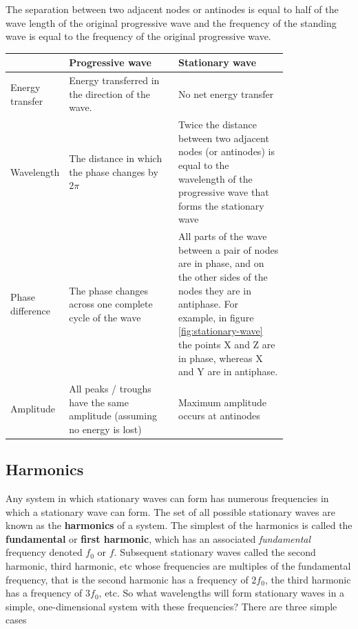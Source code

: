 The separation between two adjacent nodes or antinodes is equal to half of the wave length of the original progressive wave and the frequency of the standing wave is equal to the frequency of the original progressive wave. 

\begin{table}[h!]
    {
        \begin{tabular}{l|p{0.4\linewidth}|p{0.4\linewidth}}
            \hspace{1mm} & Progressive wave & Stationary wave  \\
            \hline
            Energy transfer & Energy transferred in the direction of the wave. & No net energy transfer \\
            Wavelength & The distance in which the phase changes by $2\pi$ & Twice the distance between two adjacent nodes (or antinodes) is equal to the wavelength of the progressive wave that forms the stationary wave  \\
            Phase difference & The phase changes across one complete cycle of the wave & All parts of the wave between a pair of nodes are in phase, and on the other sides of the nodes they are in antiphase. For example, in figure \ref{fig:stationary-wave} the points X and Z are in phase, whereas X and Y are in antiphase. \\
            Amplitude & All peaks / troughs have the same amplitude (assuming no energy is lost) & Maximum amplitude occurs at antinodes
        \end{tabular}
    }
\end{table}
\FloatBarrier

\subsection{Harmonics}

Any system in which stationary waves can form has numerous frequencies in which a stationary wave can form. The set of all possible stationary waves are known as the \textbf{harmonics} of a system. The simplest of the harmonics is called the \textbf{fundamental} or \textbf{first harmonic}, which has an associated \textit{fundamental} frequency denoted $f_0$ or $f$. Subsequent stationary waves called the second harmonic, third harmonic, etc whose frequencies are multiples of the fundamental frequency, that is the second harmonic has a frequency of $2f_0$, the third harmonic has a frequency of $3f_0$, etc. So what wavelengths will form stationary waves in a simple, one-dimensional system with these frequencies? There are three simple cases  

